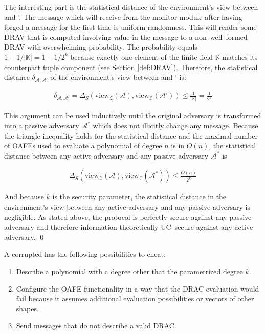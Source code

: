 The interesting part is the statistical distance of the environment's view
between \JWadv{} and \JWadv{}'. The message which \JWadv{} will receive from the
monitor module after having forged a message for the first time is uniform
randomness.  This will render some DRAV that is computed involving value in the
message to a non--well--formed DRAV with overwhelming probability. The
probability equals $1-1/|\mathbb{K}| = 1-1/2^k$ because exactly one element of
the finite field $\mathbb{K}$ matches its counterpart tuple component (see
Section \ref{def:DRAV}). Therefore, the statistical distance
$\delta_{\mathcal{A},\mathcal{A}'}$ of the environment's view between \JWadv{}
and \JWadv{}' is:

\begin{align*}
  \delta_{\mathcal{A},\mathcal{A}'} =
  \Delta_S(\text{view}_\mathcal{Z}(\mathcal{A}),
  \text{view}_\mathcal{Z}(\mathcal{A}'))
  \leq \frac{1}{|\mathbb{K}|}
  = \frac{1}{2^k}
\end{align*}

\noindent{}This argument can be used inductively until the original adversary
\JWadv{} is transformed into a passive adversary $\mathcal{A}^*$ which does not
illicitly change any message. Because the triangle inequality holds for the
statistical distance and the maximal number of OAFEs used to evaluate a
polynomial of degree $n$ is in $O(n)$, the statistical distance between any
active adversary \JWadv{} and any passive adversary $\mathcal{A}^*$ is

\begin{align*}
  \Delta_S(\text{view}_\mathcal{Z}(\mathcal{A}),
  \text{view}_\mathcal{Z}(\mathcal{A}^*))
  \leq \frac{O(n)}{2^k}
\end{align*}

\noindent{}And because $k$ is the security parameter, the statistical distance
in the environment's view between any active adversary and any passive adversary
is negligible. As stated above, the protocol is perfectly secure against any
passive adversary and therefore information theoretically UC--secure against any
active adversary. \qed



A corrupted \JWpOne{} has the following possibilities to cheat:

\begin{enumerate}

  \item Describe a polynomial with a degree other that the parametrized degree
    $k$.

  \item Configure the OAFE functionality in a way that the DRAC evaluation would
    fail because it assumes additional evaluation possibilities or vectors of
    other shapes.

  \item Send messages that do not describe a valid DRAC\@.

\end{enumerate}

